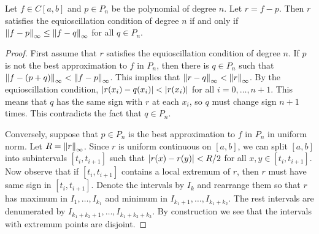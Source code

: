 \begin{theorem}
    Let $f\in C[a,b]$ and $p\in P_n$ be the polynomial of degree $n$. Let 
    $r = f - p$. Then $r$ satisfies the equioscillation condition of degree $n$ 
    if and only if $\left\lVert {f-p} \right\rVert_\infty \leq \left\lVert {f-q} \right\rVert_\infty$ for all $q\in P_n$.
\end{theorem}
\begin{proof}
    First assume that $r$ satisfies the equioscillation condition of degree $n$. 
    If $p$ is not the best approximation to $f$ in $P_n$, then there is $q\in P_n$ 
    such that $\left\lVert {f-(p+q)} \right\rVert_\infty < \left\lVert {f-p} \right\rVert_\infty$. This implies that 
    $\left\lVert {r-q} \right\rVert_\infty < \left\lVert {r} \right\rVert_\infty$. By the equioscillation condition, 
    $\left\lvert {r(x_i) - q(x_i)} \right\rvert < \left\lvert {r(x_i)} \right\rvert$ for all $i = 0,\ldots,n+1$. 
    This means that $q$ has the same sign with $r$ at each $x_i$, so $q$ must 
    change sign $n+1$ times. This contradicts the fact that $q\in P_n$.

    Conversely, suppose that $p\in P_n$ is the best approximation to $f$ in $P_n$ 
    in uniform norm. Let $R = \left\lVert {r} \right\rVert_\infty$. Since $r$ is uniform continuous 
    on $[a,b]$, we can split $[a,b]$ into subintervals $[t_i, t_{i+1}]$ such that 
    $\left\lvert {r(x) - r(y)} \right\rvert < R/2$ for all $x,y\in[t_i,t_{i+1}]$. Now observe that if 
    $[t_i,t_{i+1}]$ contains a local extremum of $r$, then $r$ must have same 
    sign in $[t_i,t_{i+1}]$. Denote the intervals by $I_k$ and rearrange them so 
    that $r$ has maximum in $I_1,\ldots,I_{k_1}$ and minimum in 
    $I_{k_1+1},\ldots,I_{k_1+k_2}$. The rest intervals are denumerated by 
    $I_{k_1+k_2+1},\ldots,I_{k_1+k_2+k_3}$. By construction we see that 
    the intervals with extremum points are disjoint. 
    

\end{proof}

